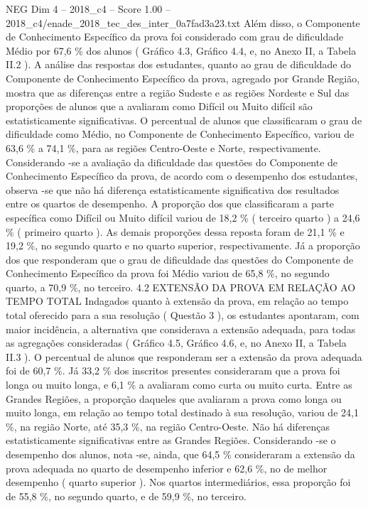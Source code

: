 \begin{textsample}{NEG Dim 4 – 2018\_c4 – Score 1.00 – 2018\_c4/enade\_2018\_tec\_des\_inter\_0a7fad3a23.txt}
Além disso, o Componente de Conhecimento Específico da prova foi considerado com grau de dificuldade Médio por 67,6 \% dos alunos ( Gráfico 4.3, Gráfico 4.4, e, no Anexo II, a Tabela II.2 ).
A análise das respostas dos estudantes, quanto ao grau de dificuldade do Componente de Conhecimento Específico da prova, agregado por Grande Região, mostra que as diferenças entre a região Sudeste e as regiões Nordeste e Sul das proporções de alunos que a avaliaram como Difícil ou Muito difícil são estatisticamente significativas.
O percentual de alunos que classificaram o grau de dificuldade como Médio, no Componente de Conhecimento Específico, variou de 63,6 \% a 74,1 \%, para as regiões Centro-Oeste e Norte, respectivamente.
Considerando -se a avaliação da dificuldade das questões do Componente de Conhecimento Específico da prova, de acordo com o desempenho dos estudantes, observa -se que não há diferença estatisticamente significativa dos resultados entre os quartos de desempenho.
A proporção dos que classificaram a parte específica como Difícil ou Muito difícil variou de 18,2 \% ( terceiro quarto ) a 24,6 \% ( primeiro quarto ).
As demais proporções dessa reposta foram de 21,1 \% e 19,2 \%, no segundo quarto e no quarto superior, respectivamente.
Já a proporção dos que responderam que o grau de dificuldade das questões do Componente de Conhecimento Específico da prova foi Médio variou de 65,8 \%, no segundo quarto, a 70,9 \%, no terceiro. 4.2 EXTENSÃO DA PROVA EM RELAÇÃO AO TEMPO TOTAL Indagados quanto à extensão da prova, em relação ao tempo total oferecido para a sua resolução ( Questão 3 ), os estudantes apontaram, com maior incidência, a alternativa que considerava a extensão adequada, para todas as agregações consideradas ( Gráfico 4.5, Gráfico 4.6, e, no Anexo II, a Tabela II.3 ).
O percentual de alunos que responderam ser a extensão da prova adequada foi de 60,7 \%.
Já 33,2 \% dos inscritos presentes consideraram que a prova foi longa ou muito longa, e 6,1 \% a avaliaram como curta ou muito curta.
Entre as Grandes Regiões, a proporção daqueles que avaliaram a prova como longa ou muito longa, em relação ao tempo total destinado à sua resolução, variou de 24,1 \%, na região Norte, até 35,3 \%, na região Centro-Oeste.
Não há diferenças estatisticamente significativas entre as Grandes Regiões.
Considerando -se o desempenho dos alunos, nota -se, ainda, que 64,5 \% consideraram a extensão da prova adequada no quarto de desempenho inferior e 62,6 \%, no de melhor desempenho ( quarto superior ).
Nos quartos intermediários, essa proporção foi de 55,8 \%, no segundo quarto, e de 59,9 \%, no terceiro.

\end{textsample}
